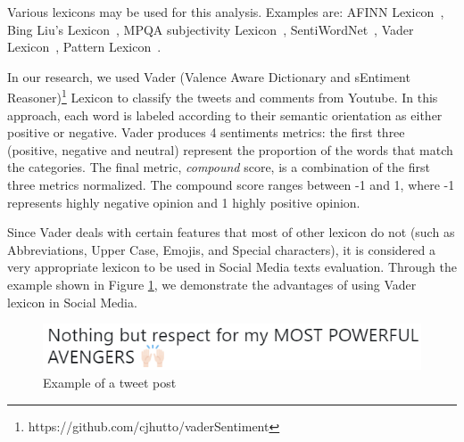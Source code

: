 Various lexicons may be used for this analysis. Examples are: AFINN Lexicon~\cite{afinn}\cite{anew}, Bing Liu's Lexicon~\cite{Jinda}, MPQA subjectivity Lexicon~\cite{Wilson}, SentiWordNet~\cite{esuli-sentiwordnet}\cite{baccianella-sentiwordnet}, Vader Lexicon~\cite{vader}, Pattern Lexicon~\cite{pattern}. 

In our research, we used Vader (Valence Aware Dictionary and sEntiment Reasoner)\footnote{https://github.com/cjhutto/vaderSentiment}
Lexicon to classify the tweets and comments from Youtube. In this approach, each word is labeled according to their semantic orientation as either positive or negative. Vader produces 4 sentiments metrics: the first three (positive, negative and neutral) represent the proportion of the words that match the categories. The final metric, \textit{compound} score, is a combination of the first three metrics normalized.
The compound score ranges between -1 and 1, where -1 represents highly negative opinion and 1 highly positive opinion.

Since Vader deals with certain features that most of other lexicon do not (such as Abbreviations, Upper Case, Emojis, and Special characters), it is considered a very appropriate lexicon to be used in Social Media texts evaluation\cite{vader}. 
Through the example shown in Figure \ref{fig:tweet1}, we demonstrate the advantages of using Vader lexicon in Social Media.


\begin{figure}[htb]
    \begin{center}
        \includegraphics[width=0.8\linewidth]{img/Twitter1.png}
    \end{center}
       \caption{Example of a tweet post} %
    \label{fig:tweet1}
\end{figure}

